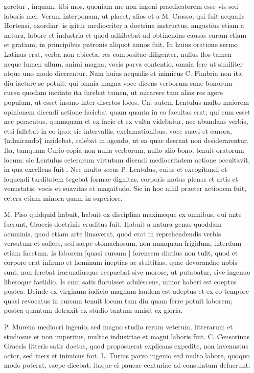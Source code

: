 geretur , inquam, tibi mos, quoniam me non ingeni praedicatorem esse vis sed laboris mei. Verum interponam, ut placet, alios et a M. Crasso, qui fuit aequalis Hortensi, exordiar. is igitur mediocriter a doctrina instructus, angustius etiam a natura, labore et industria et quod adhibebat ad obtinendas causas curam etiam et gratiam, in principibus patronis aliquot annos fuit. In huius oratione sermo Latinus erat, verba non abiecta, res compositae diligenter, nullus flos tamen neque lumen ullum, animi magna, vocis parva contentio, omnia fere ut similiter atque uno modo dicerentur. Nam huius aequalis et inimicus C. Fimbria non ita diu iactare se potuit; qui omnia magna voce dicens verborum sane bonorum cursu quodam incitato ita furebat tamen, ut mirarere tam alias res agere populum, ut esset insano inter disertos locos. Cn. autem Lentulus multo maiorem opinionem dicendi actione faciebat quam quanta in eo facultas erat; qui cum esset nec peracutus, quamquam et ex facie et ex vultu videbatur, nec abundans verbis, etsi fallebat in eo ipso: sic intervallis, exclamationibus, voce suavi et canora, †admirando† inridebat, calebat in agendo, ut ea quae deerant non desiderarentur. Ita, tamquam Curio copia non nulla verborum, nullo alio bono, tenuit oratorum locum: sic Lentulus ceterarum virtutum dicendi mediocritatem actione occultavit, in qua excellens fuit . Nec multo secus P. Lentulus, cuius et excogitandi et loquendi tarditatem tegebat formae dignitas, corporis motus plenus et artis et venustatis, vocis et suavitas et magnitudo. Sic in hoc nihil praeter actionem fuit, cetera etiam minora quam in superiore.

 M. Piso quidquid habuit, habuit ex disciplina maximeque ex omnibus, qui ante fuerunt, Graecis doctrinis eruditus fuit. Habuit a natura genus quoddam acuminis, quod etiam arte limaverat, quod erat in reprehendendis verbis versutum et sollers, sed saepe stomachosum, non numquam frigidum, interdum etiam facetum. Is laborem [quasi cursum ] forensem diutius non tulit, quod et corpore erat infirmo et hominum ineptias ac stultitias, quae devorandae nobis sunt, non ferebat iracundiusque respuebat sive morose, ut putabatur, sive ingenuo liberoque fastidio. Is cum satis floruisset adulescens, minor haberi est coeptus postea. Deinde ex virginum iudicio magnam laudem est adeptus et ex eo tempore quasi revocatus in cursum tenuit locum tam diu quam ferre potuit laborem; postea quantum detraxit ex studio tantum amisit ex gloria.

 P. Murena mediocri ingenio, sed magno studio rerum veterum, litterarum et studiosus et non imperitus, multae industriae et magni laboris fuit. C. Censorinus Graecis litteris satis doctus, quod proposuerat explicans expedite, non invenustus actor, sed iners et inimicus fori. L. Turius parvo ingenio sed multo labore, quoquo modo poterat, saepe dicebat; itaque ei paucae centuriae ad consulatum defuerunt.

